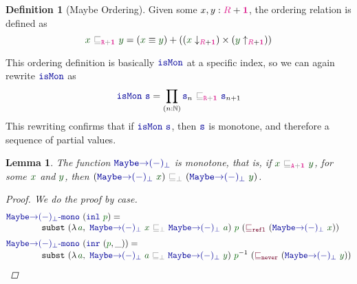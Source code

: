 \documentclass[twoside,11pt,openright]{report}
\theoremstyle{plain} %
\newtheorem{lem}[thm]{Lemma}
\theoremstyle{definition}
\newtheorem{defn}{Definition}[section]
\theoremstyle{remark}
\newcommand*{\term}[1]{\textcolor{green!30!black}{#1}} %
\newcommand*{\pathterm}[1]{\textcolor{green!40!black}{#1}}
\newcommand*{\type}[1]{\textcolor{magenta!90!black}{#1}}
\newcommand*{\unit}{\type{\textbf{1}}}
\newcommand*{\relation}[1]{\textcolor{gray}{\ensuremath{\mathtt{#1}}}}
\newcommand*{\function}[1]{\textcolor{blue!60!black}{\ensuremath{\mathtt{#1}}}}
\newcommand*{\constructor}[1]{\textcolor{purple!60!black}{\ensuremath{\mathtt{#1}}}}
\newcommand*{\sym}[1]{\ensuremath{#1^{-1}}}
\begin{document}
\begin{defn}[Maybe Ordering]
  \label{eq:maybe-order}
  Given some \(x,y : \type{R} + \unit\), the ordering relation is defined as
  \begin{equation}
    \term{x}~\relation{\sqsubseteq_{\type{R} + \unit}}~\term{y} = (\term{x} \equiv \term{y}) + ((\term{x}  \downarrow_{\type{R} + \unit}) \times (\term{y} \uparrow_{\type{R} + \unit}))
  \end{equation}
\end{defn}
\noindent This ordering definition is basically \(\function{isMon}\) at a specific index, so we can again rewrite \(\function{isMon}\) as
\begin{equation}
  \function{isMon}~\function{s} = \prod_{(n : \mathbb{N})} \function{s}_n~\relation{\sqsubseteq_{\type{R} + \unit}}~\function{s}_{n+1}
\end{equation}
This rewriting confirms that if \(\function{isMon}~\function{s}\), then \(\function{s}\) is monotone, and therefore a sequence of partial values.
\begin{lem}
  The function \(\function{Maybe{\rightarrow}(-)_\bot}\) is monotone, that is, if \(\term{x}~\relation{\sqsubseteq_{\type{A} + \unit}}~\term{y}\), for some \(\term{x}\) and \(\term{y}\), then \((\function{Maybe{\rightarrow}(-)_\bot}~\term{x})~\relation{\sqsubseteq_{\bot}}~(\function{Maybe{\rightarrow}(-)_\bot}~\term{y})\).
  \begin{proof}
    We do the proof by case.
    \begin{equation}
      \begin{aligned}
        &\function{Maybe{\rightarrow}(-)_\bot\text{-}mono}~(\function{inl}~\pathterm{p}) = \\[-1mm]
        &\qquad\qquad \mathtt{subst}~(\lambda\,\term{a},~\function{Maybe{\rightarrow}(-)_\bot}~\term{x}~\relation{\sqsubseteq_{\bot}}~\function{Maybe{\rightarrow}(-)_\bot}~\term{a})~\pathterm{p}~(\constructor{\sqsubseteq_{refl}}~(\function{Maybe{\rightarrow}(-)_\bot}~\term{x})) \\[1mm]
        &\function{Maybe{\rightarrow}(-)_\bot\text{-}mono}~(\function{inr}~(\pathterm{p}, \_)) = \\[-1mm]
        &\qquad\qquad \mathtt{subst}~(\lambda\,\term{a},~\function{Maybe{\rightarrow}(-)_\bot}~\term{a}~\relation{\sqsubseteq_{\bot}}~\function{Maybe{\rightarrow}(-)_\bot}~\term{y})~\sym{\pathterm{p}}~(\constructor{\sqsubseteq_{never}}~(\function{Maybe{\rightarrow}(-)_\bot}~\term{y}))
      \end{aligned}
    \end{equation}
  \end{proof}
\end{lem}
\end{document}
